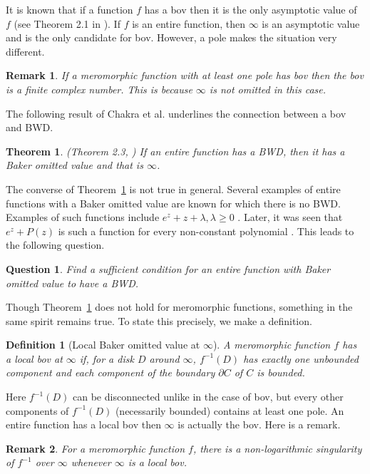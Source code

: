 \documentclass[11pt,a4paper]{article}
\newtheorem{theorem}{Theorem}[section]
\newtheorem{definition}{Definition}[section]
\newtheorem{Remark}{Remark}[section]
\newtheorem{Question}{Question}
\begin{document}
	It is known that if a function $f$ has a bov then it is the only asymptotic value of $f$ (see Theorem 2.1 in \cite{ChakraChakrabortyNayak 2016}). If $f$ is an entire function, then $\infty$ is an asymptotic value and is the only candidate for bov. However, a pole makes the situation very different.
	\begin{Remark}
If  a meromorphic function with at least one pole has 	  bov then the bov is  a finite complex number. This is because $\infty$ is not omitted in this case.
		 \label{BOV-mero}
	\end{Remark}  The following result of Chakra et al. underlines the connection between a bov and BWD. 
	\begin{theorem}(Theorem 2.3, \cite{ChakraChakrabortyNayak 2016})
		If an entire function has a BWD, then it has a Baker omitted value and that is $\infty$.
		\label{BOV-BWD}
	\end{theorem}
 The converse of Theorem~\ref{BOV-BWD} is not true in general.
		Several examples of entire functions with a Baker omitted value are known for which there is no BWD. Examples of such functions include $e^z +z +\lambda, \lambda \geq 0$ \cite{ChakraChakrabortyNayak 2016}. Later, it was seen that $e^z +P(z)$ is such a function for every non-constant polynomial \cite{DasNayak 2024}. This leads to the following question.
		\begin{Question}
			Find a sufficient condition for an entire function with Baker omitted value to have a BWD.
			\end{Question}
			
	
	
	Though Theorem~\ref{BOV-BWD} does not hold for meromorphic functions, something in the same spirit remains true. To state this precisely, we make a definition.
	\begin{definition}[Local Baker omitted value at $\infty$]
		A meromorphic function $f$ has a local bov at $\infty$  if, for a disk $D$ around $\infty$, $f^{-1}(D)$ has exactly one unbounded component  and each component of the boundary $\partial C$ of $C$ is bounded.
	\end{definition}
Here $f^{-1}(D)$ can be disconnected unlike in the case of bov, but every other components of $f^{-1}(D)$ (necessarily bounded) contains at least one pole.  
An entire function has a local bov then  $\infty$ is actually the bov.
Here is a remark.
	\begin{Remark}
	For a meromorphic function $f$, there is a non-logarithmic singularity of $f^{-1}$ over $\infty$ whenever $\infty$ is a local bov.
\end{Remark}
\end{document}
